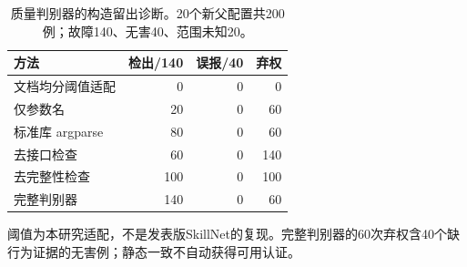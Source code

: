 \begin{table}[t]
\caption{质量判别器的构造留出诊断。20个新父配置共200例；故障140、无害40、范围未知20。}\label{tab:gate}
\centering\small
\begin{tabularx}{\columnwidth}{Xrrr}
\toprule
方法 & 检出/140 & 误报/40 & 弃权 \\
\midrule
文档均分阈值适配 & 0 & 0 & 0 \\
仅参数名 & 20 & 0 & 60 \\
标准库 argparse & 80 & 0 & 60 \\
去接口检查 & 60 & 0 & 140 \\
去完整性检查 & 100 & 0 & 100 \\
完整判别器 & 140 & 0 & 60 \\
\bottomrule
\end{tabularx}
\par\vspace{3pt}\raggedright\footnotesize 阈值为本研究适配，不是发表版SkillNet的复现。完整判别器的60次弃权含40个缺行为证据的无害例；静态一致不自动获得可用认证。
\end{table}
